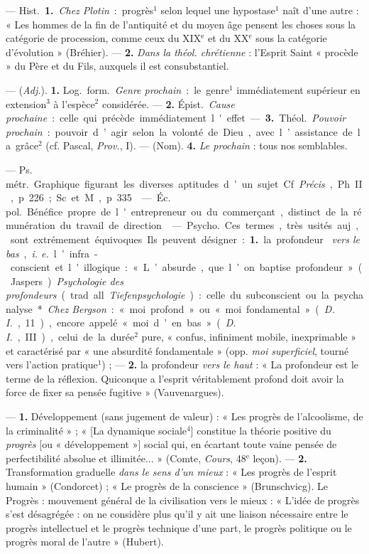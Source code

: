 \begin{itemize}[leftmargin=1cm, label=, itemsep=1pt]
 — \si{Hist.} {\bf 1.} {\it Chez Plotin} : progrès$^1$ selon
lequel une hypostase$^1$ naît d’une autre : « Les hommes de la fin de
l'antiquité et du moyen âge pensent les choses sous la catégorie
de procession, comme ceux du {\footnotesize XIX}$^\text{e}$ et du
{\footnotesize XX}$^\text{e}$ sous la catégorie d'évolution » (Bréhier). —
{\bf 2.} {\it Dans la théol. chrétienne} : l'Esprit Saint « procède » du
Père et du Fils, auxquels il est consubstantiel.

 — ({\it Adj.}). {\bf 1.} \si{Log.} \si{form.} {\it Genre
prochain} : le genre$^1$ immédiatement supérieur en extension$^3$ à
l'espèce$^2$ considérée. — {\bf 2.} \si{Épist.} {\it Cause prochaine} : celle qui
précède immédiatement l'effet. — {\bf 3.} \si{Théol.} {\it Pouvoir
prochain} : pouvoir d’agir selon la volonté de Dieu, avec l’assistance de la
grâce$^2$ (cf. Pascal, {\it Prov.}, I). — (Nom). {\bf 4.} {\it Le
prochain} : tous nos semblables.


 — \si{Ps. métr.} Graphique figurant les diverses
aptitudes d’un sujet. Cf. {\it Précis}, Ph. II, p. 226 ; Sc. et M., p. 335.

 — \si{Éc. pol.} Bénéfice propre de l'entrepreneur ou du
commerçant, distinct de la rémunération du travail de direction.

 — \si{Psycho.} Ces termes, très usités auj., sont
extrémement équivoques. Ils peuvent désigner : {\bf 1.} la profondeur {\it
vers le bas}, {\it i. e.} l’infra-conscient et l'illogique : « L’absurde,
que l’on baptise profondeur » (Jaspers). {\it Psychologie des profondeurs}
(trad. all. {\it Tiefenpsychologie}) : celle du subconscient ou la
psychanalyse*. {\it Chez Bergson} : « moi profond » ou « moi fondamental
» ({\it D. I.}, 11), encore appelé « moi d’en bas » ({\it D. I.}, III),
celui de la durée$^2$ pure, « confus, infiniment mobile, inexprimable » et
caractérisé par « une absurdité fondamentale » (opp. {\it moi superficiel},
tourné vers l’action pratique$^1$) ; — {\bf 2.} la profondeur {\it vers le
haut} : « La profondeur est le terme de la réflexion. Quiconque a l'esprit
véritablement
profond doit avoir la force de fixer sa pensée fugitive » (Vauvenargues).

 —  {\bf 1.} Développement (sans jugement de
valeur) : « Les progrès de l'alcoolisme, de la criminalité » ; « [La
dynamique sociale$^4$] constitue la théorie positive du {\it progrès} [ou «
développement »] social qui, en écartant toute vaine pensée de
perfectibilité absolue et illimitée... » (Comte, {\it Cours}, 48$^\text{e}$
leçon). —  {\bf 2.} Transformation graduelle {\it dans le
sens d'un mieux} : « Les progrès de l'esprit humain » (Condorcet) ; « Le
progrès de la conscience » (Brunschvicg). Le Progrès : mouvement général de
la civilisation vers le mieux : « L'idée de progrès s’est désagrégée : on ne
considère plus qu'il y ait une liaison nécessaire entre le progrès
intellectuel et le progrès technique d'une part, le progrès politique ou le
progrès moral de l’autre » (Hubert).


\end{itemize}
